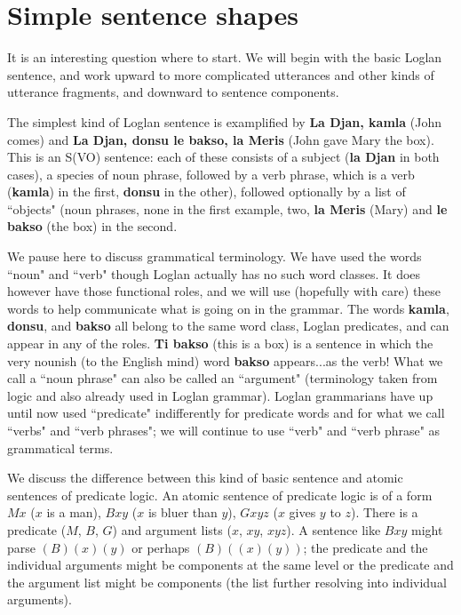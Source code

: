 \documentclass[12pt]{book}
\begin{document}
{\section{Simple sentence shapes}

It is an interesting question where to start.  We will begin with the basic Loglan sentence, and work upward to more complicated utterances and other kinds of utterance fragments, and downward to sentence components.

The simplest kind of Loglan sentence is examplified by {\bf La Djan, kamla} (John comes) and {\bf La Djan, donsu le bakso, la Meris} (John gave Mary the box).  This is an S(VO) sentence:  each of these consists of a subject ({\bf la Djan} in both cases), a species of noun phrase, followed by a verb phrase, which is a verb ({\bf kamla}) in the first, {\bf donsu} in the other), followed optionally by a list of ``objects" (noun phrases, none in the first example, two, {\bf la Meris} (Mary) and {\bf le bakso} (the box) in the second.

We pause here to discuss grammatical terminology.  We have used the words ``noun" and ``verb"  though Loglan actually has no such word classes.  It does however have those functional roles, and we will use (hopefully with care) these words to help communicate what is going on in the grammar.  The words {\bf kamla}, {\bf donsu}, and {\bf bakso} all belong to the same word class, Loglan predicates, and can appear in any of the roles.  {\bf Ti bakso} (this is a box) is a sentence in which the very nounish (to the English mind) word {\bf bakso} appears...as the verb!  What we call a ``noun phrase" can also be called an ``argument" (terminology taken from logic and also already used in Loglan grammar).  Loglan grammarians have up until now used ``predicate" indifferently for predicate words and for what we call ``verbs" and ``verb phrases";  we will continue to use ``verb" and ``verb phrase" as grammatical terms.

We discuss the difference between this kind of basic sentence and atomic sentences of predicate logic.  An atomic sentence of predicate logic is of a form $Mx$ ($x$ is a man),
$Bxy$ ($x$ is bluer than $y$), $Gxyz$ ($x$ gives $y$ to $z$).  There is a predicate ($M$, $B$, $G$) and argument lists ($x$, $xy$, $xyz$).  A sentence like $Bxy$ might parse
$(B)(x)(y)$ or perhaps $(B)((x)(y))$;  the predicate and the individual arguments might be components at the same level or the predicate and the argument list might be components (the list further resolving into individual arguments).

}
\end{document}
